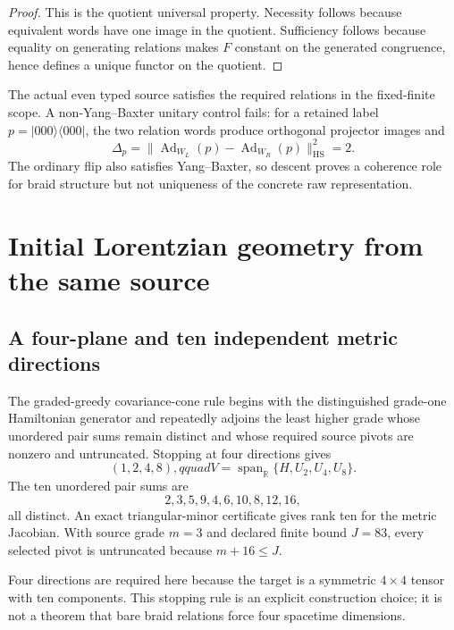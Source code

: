 \documentclass[11pt]{article}
\theoremstyle{definition}
\theoremstyle{remark}
\newcommand{\Span}{\operatorname{span}}
\begin{document}
\begin{proof}
This is the quotient universal property. Necessity follows because equivalent words have one image in the quotient. Sufficiency follows because equality on generating relations makes $F$ constant on the generated congruence, hence defines a unique functor on the quotient.
\end{proof}

The actual even typed source satisfies the required relations in the fixed-finite scope. A non-Yang--Baxter unitary control fails: for a retained label $p=|000\rangle\langle000|$, the two relation words produce orthogonal projector images and
\begin{equation}
  \Delta_p=\|\operatorname{Ad}_{W_L}(p)-\operatorname{Ad}_{W_R}(p)\|_{\mathrm{HS}}^2=2.
\end{equation}
The ordinary flip also satisfies Yang--Baxter, so descent proves a coherence role for braid structure but not uniqueness of the concrete raw representation.

\section{Initial Lorentzian geometry from the same source}

\subsection{A four-plane and ten independent metric directions}

The graded-greedy covariance-cone rule begins with the distinguished grade-one Hamiltonian generator and repeatedly adjoins the least higher grade whose unordered pair sums remain distinct and whose required source pivots are nonzero and untruncated. Stopping at four directions gives
\begin{equation}
  (1,2,4,8),qquad
  V=\Span_{\mathbb{R}}\{H,U_2,U_4,U_8\}.
\end{equation}
The ten unordered pair sums are
\begin{equation}
  2,3,5,9,4,6,10,8,12,16,
\end{equation}
all distinct. An exact triangular-minor certificate gives rank ten for the metric Jacobian. With source grade $m=3$ and declared finite bound $J=83$, every selected pivot is untruncated because $m+16\le J$.

Four directions are required here because the target is a symmetric $4\times4$ tensor with ten components. This stopping rule is an explicit construction choice; it is not a theorem that bare braid relations force four spacetime dimensions.
\end{document}
